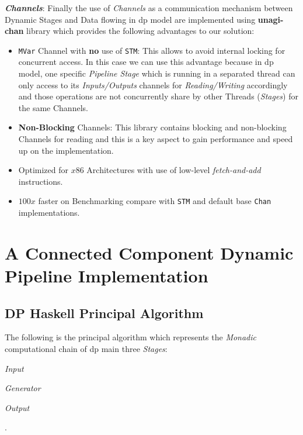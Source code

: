 \documentclass[preprint]{elsarticle}
\begin{document}
\textbf{\textit{Channels}}\label{section:channels}: Finally the use of \emph{Channels} as a communication mechanism between Dynamic Stages and Data flowing in \acrshort{dp} model are implemented using \textbf{unagi-chan} \cite{unagi} library which provides the following advantages to our solution:

\begin{itemize}
  \item \texttt{MVar} Channel with \textbf{no} use of \texttt{STM}: This allows to avoid internal locking for concurrent access. In this case
  we can use this advantage because in \acrshort{dp} model, one specific \textit{Pipeline Stage} which is running in a separated thread can only access to its \textit{Inputs/Outputs} channels for \textit{Reading/Writing} accordingly 
  and those operations are not concurrently share by other Threads (\textit{Stages}) for the same Channels.  
  \item \textbf{Non-Blocking} Channels: This library contains blocking and non-blocking Channels for reading and this is a key aspect to gain performance and speed up on the implementation.
  \item Optimized for $x86$ Architectures with use of low-level \textit{fetch-and-add} instructions.
  \item $100x$ faster on Benchmarking compare with \texttt{STM} and default base \texttt{Chan} implementations.
\end{itemize}

\section{A Connected Component Dynamic Pipeline Implementation}

\subsection{DP Haskell Principal Algorithm}

The following is the principal algorithm which represents the \textit{Monadic} computational chain of \acrshort{dp} main three \textit{Stages}: \begin{inparaenum}[i\upshape)]
\item \emph{Input}
\item \emph{Generator}
\item \emph{Output}
 \end{inparaenum}.
\end{document}
